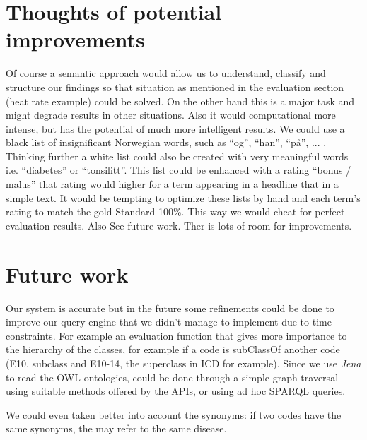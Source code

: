 \documentclass{article}
\begin{document}
\section{Thoughts of potential improvements}
Of course a semantic approach would allow us to understand, classify and structure our findings so that situation as mentioned in the evaluation section (heat rate example) could be solved. On the other hand this is a major task and might degrade results in other situations. Also it would computational more intense, but has the potential of much more intelligent results.
We could use a black list of insignificant Norwegian words, such as "`og"', "`han"', "`på"', ... . Thinking further a white list could also be created with very meaningful words i.e. "`diabetes"' or "`tonsilitt"'. This list could be enhanced with a rating "`bonus / malus"' that rating would higher for a term appearing in a headline that in a simple text. It would be tempting to optimize these lists by hand and each term's rating to match the gold Standard 100\%. This way we would cheat for perfect evaluation results. Also See future work. Ther is lots of room for improvements.

\section{Future work}
Our system is accurate but in the future some refinements could be done to improve our query engine that we didn't manage to implement due to time constraints. For example an evaluation function that gives more  importance to the hierarchy of the classes, for example if a code is subClassOf another code (E10, subclass and E10-14, the superclass in ICD for example). Since we use \emph{Jena} to read the OWL ontologies, could be done through a simple graph traversal using suitable methods offered by the APIs, or using ad hoc SPARQL queries.

We could even taken better into account the synonyms: if two codes have the same synonyms, the may refer to the same disease.
\end{document}
